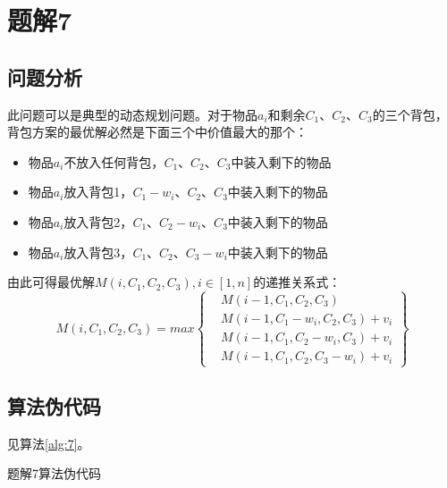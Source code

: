 \section{题解7}
\subsection{问题分析}
此问题可以是典型的动态规划问题。对于物品$a_i$和剩余$C_1$、$C_2$、$C_3$的三个背包，背包方案的最优解必然是下面三个中价值最大的那个：
\begin{itemize}
    \item 物品$a_i$不放入任何背包，$C_1$、$C_2$、$C_3$中装入剩下的物品
    \item 物品$a_i$放入背包1，$C_1-w_i$、$C_2$、$C_3$中装入剩下的物品
    \item 物品$a_i$放入背包2，$C_1$、$C_2-w_i$、$C_3$中装入剩下的物品
    \item 物品$a_i$放入背包3，$C_1$、$C_2$、$C_3-w_i$中装入剩下的物品
\end{itemize}
由此可得最优解$M(i,C_1,C_2,C_3),i\in [1,n]$的递推关系式：
$$
    M(i,C_1,C_2,C_3)=max\left\{\begin{aligned}
         & M(i-1,C_1,C_2,C_3)         \\
         & M(i-1,C_1-w_i,C_2,C_3)+v_i \\
         & M(i-1,C_1,C_2-w_i,C_3)+v_i \\
         & M(i-1,C_1,C_2,C_3-w_i)+v_i
    \end{aligned}\right\}
$$

\subsection{算法伪代码}
见算法\ref{alg:7}。
\begin{algorithm}[htbp]
    \caption{题解7算法伪代码}\label{alg:7}
\end{algorithm}